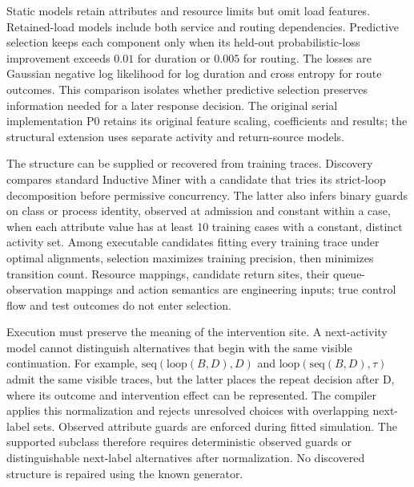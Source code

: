 Static models retain attributes and resource limits but omit load features. Retained-load models include both service and routing dependencies. Predictive selection keeps each component only when its held-out probabilistic-loss improvement exceeds $0.01$ for duration or $0.005$ for routing. The losses are Gaussian negative log likelihood for log duration and cross entropy for route outcomes. This comparison isolates whether predictive selection preserves information needed for a later response decision. The original serial implementation P0 retains its original feature scaling, coefficients and results; the structural extension uses separate activity and return-source models.

The structure can be supplied or recovered from training traces. Discovery compares standard Inductive Miner with a candidate that tries its strict-loop decomposition before permissive concurrency. The latter also infers binary guards on class or process identity, observed at admission and constant within a case, when each attribute value has at least 10 training cases with a constant, distinct activity set. Among executable candidates fitting every training trace under optimal alignments, selection maximizes training precision, then minimizes transition count. Resource mappings, candidate return sites, their queue-observation mappings and action semantics are engineering inputs; true control flow and test outcomes do not enter selection.

Execution must preserve the meaning of the intervention site. A next-activity model cannot distinguish alternatives that begin with the same visible continuation. For example, $\mathrm{seq}(\mathrm{loop}(B,D),D)$ and $\mathrm{loop}(\mathrm{seq}(B,D),\tau)$ admit the same visible traces, but the latter places the repeat decision after D, where its outcome and intervention effect can be represented. The compiler applies this normalization and rejects unresolved choices with overlapping next-label sets. Observed attribute guards are enforced during fitted simulation. The supported subclass therefore requires deterministic observed guards or distinguishable next-label alternatives after normalization. No discovered structure is repaired using the known generator.

